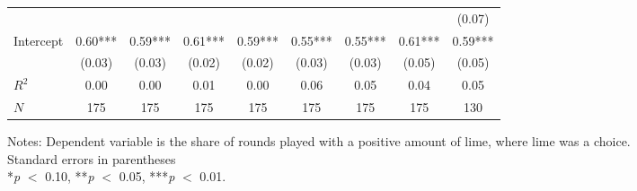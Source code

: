 \begin{table}[htbp]
\begin{threeparttable}
\begin{tabular}{l cccccccc}
                    &               &               &               &               &               &               &               &      (0.07)   \\
Intercept           &        0.60***&        0.59***&        0.61***&        0.59***&        0.55***&        0.55***&        0.61***&        0.59***\\
                    &      (0.03)   &      (0.03)   &      (0.02)   &      (0.02)   &      (0.03)   &      (0.03)   &      (0.05)   &      (0.05)   \\
\hline
$R^2$               &        0.00   &        0.00   &        0.01   &        0.00   &        0.06   &        0.05   &        0.04   &        0.05   \\
$N$                 &         175   &         175   &         175   &         175   &         175   &         175   &         175   &         130   \\
\hline
\hline
\end{tabular}
\begin{tablenotes}
\footnotesize
\item{Notes: Dependent variable is the share of rounds played with a positive amount of lime, where lime was a choice. \\ Standard errors in parentheses \\ *\textit{p} $<$ 0.10, **\textit{p} $<$ 0.05, ***\textit{p} $<$ 0.01.}
\end{tablenotes}
\end{threeparttable}
\end{table}

